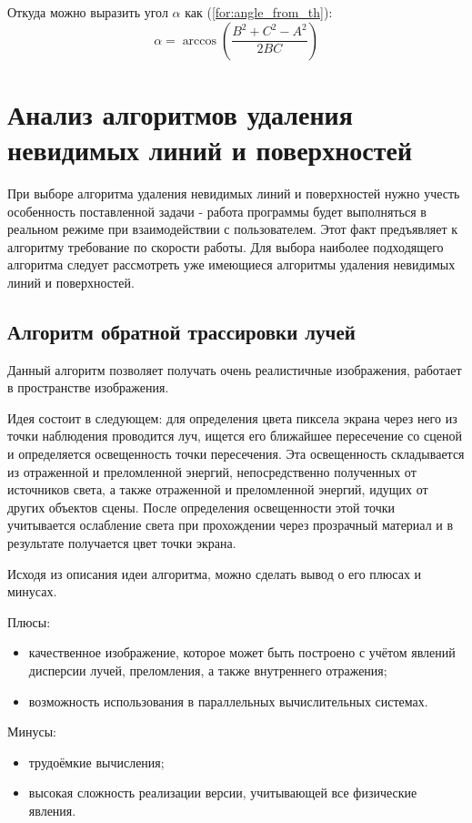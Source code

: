 Откуда можно выразить угол $\alpha$ как (\ref{for:angle_from_th}):
\begin{equation}
    \label{for:angle_from_th}
    \alpha = \arccos{\left(\frac{B^2 + C^2 - A^2}{2BC}\right)}
\end{equation}

\section{Анализ алгоритмов удаления невидимых линий и поверхностей}

При выборе алгоритма удаления невидимых линий и поверхностей нужно учесть особенность поставленной задачи - работа программы будет выполняться в реальном режиме при взаимодействии с пользователем. Этот факт предъявляет к алгоритму требование по скорости работы. Для выбора наиболее подходящего алгоритма следует рассмотреть уже имеющиеся алгоритмы удаления невидимых линий и поверхностей.

\subsection{Алгоритм обратной трассировки лучей}
Данный алгоритм позволяет получать очень реалистичные изображения, работает в пространстве изображения.

Идея состоит в следующем: для определения цвета пиксела экрана через него из точки наблюдения проводится луч, ищется его ближайшее пересечение со сценой и определяется освещенность точки пересечения. Эта освещенность складывается из отраженной и преломленной энергий, непосредственно полученных от источников света, а также отраженной и преломленной энергий, идущих от других объектов сцены. После определения освещенности этой точки учитывается ослабление света при прохождении через прозрачный материал и в результате получается цвет точки экрана.

Исходя из описания идеи алгоритма, можно сделать вывод о его плюсах и минусах.

Плюсы:
\begin{itemize}
    \item качественное изображение, которое может быть построено с учётом явлений дисперсии лучей, преломления, а также внутреннего отражения;
    \item возможность использования в параллельных вычислительных системах.
\end{itemize}

Минусы:
\begin{itemize}
    \item трудоёмкие вычисления;
    \item высокая сложность реализации версии, учитывающей все физические явления.
\end{itemize}

